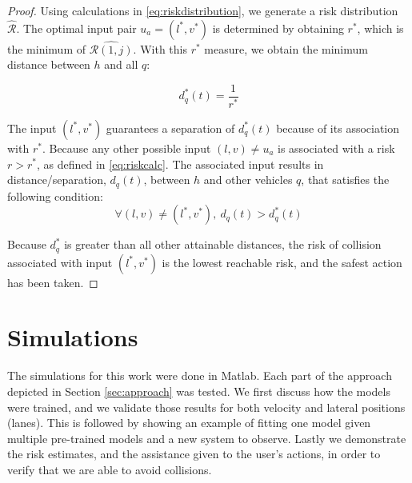 \documentclass[letterpaper, 10 pt, conference]{ieeeconf}  %
\begin{document}
\begin{proof}
Using calculations in \eqref{eq:riskdistribution}, we generate a risk distribution $\hat{\mathcal{R}}$. The optimal input pair $u_a=(l^*,v^*)$ is determined by obtaining $r^*$, which is the minimum of $\hat{\mathcal{R}(1,j)}$. With this $r^*$ measure, we obtain the minimum distance between $h$ and all $q$:

\begin{equation}
d^*_q(t) = \frac{1}{r^*}
\end{equation}

The input $(l^*,v^*)$ guarantees a separation of $d^*_q(t)$ because of its association with $r^*$. Because any other possible input $(l,v) \neq u_a$ is associated with a risk $r>r^*$, as defined in \eqref{eq:riskcalc}. The associated input results in distance/separation, $d_q(t)$, between $h$ and other vehicles $q$, that satisfies the following condition:
\begin{equation}
\forall{(l,v) \neq (l^*,v^*)},~d_q(t) > d^*_q(t)
\end{equation}

Because $d_q^*$ is greater than all other attainable distances, the risk of collision associated with input $(l^*,v^*)$ is the lowest reachable risk, and the safest action has been taken.

\end{proof}


\section{Simulations} \label{sec:sims}
The simulations for this work were done in Matlab. Each part of the approach depicted in Section \ref{sec:approach} was tested. We first discuss how the models were trained, and we validate those results for both velocity and lateral positions (lanes). This is followed by showing an example of fitting one model given multiple pre-trained models and a new system to observe. Lastly we demonstrate the risk estimates, and the assistance given to the user's actions, in order to verify that we are able to avoid collisions.
\end{document}
